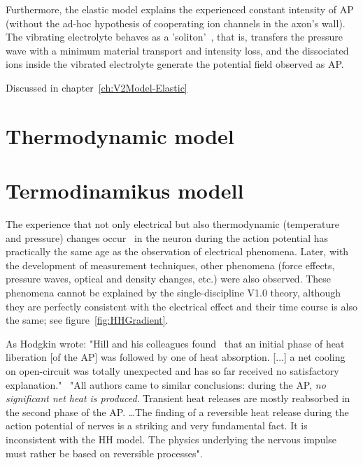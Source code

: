 Furthermore, the  elastic model explains the experienced constant intensity
of \gls{AP} (without the ad-hoc hypothesis of cooperating
ion channels in the axon's wall). The vibrating electrolyte 
behaves as a 'soliton'~\cite{SolitonPropagation:2005}, that is, transfers the pressure wave with a minimum material transport and intensity loss, and the dissociated ions inside the vibrated electrolyte generate the potential field observed as \gls{AP}.



Discussed in chapter~\ref{ch:V2Model-Elastic}

\fi




\ifx\magyar\undefined
\section[Thermodynamic model]{Thermodynamic model\label{sec:V2-0_ThermodynamicModel}}

\else
\section[Termodinamikus modell]{Termodinamikus modell\label{sec:V2-0_ThermodynamicModel}}

\fi

\ifx\magyar\undefined
The experience that not only electrical but also thermodynamic (temperature and pressure) changes occur~\cite{HeatProductionNeuron:1958} in the neuron during the action potential has practically the same age as the observation of electrical phenomena. Later, with the development of measurement techniques, other phenomena (force effects, pressure waves, optical and density changes, etc.) were also observed. These phenomena cannot be explained by the single-discipline V1.0 theory, although they are perfectly consistent with the electrical effect and their time course is also the same; see figure~\ref{fig:HHGradient}.



As Hodgkin wrote: "Hill and his colleagues found~\cite{HeatProductionNeuron:1958} that an initial phase of heat liberation [of the \gls{AP}] was followed by one of
heat absorption. [...] a net cooling on open-circuit was totally unexpected
and has so far received no satisfactory explanation."~\cite{HodgkinConduction:1964}
"All authors came to similar conclusions: during
the \gls{AP}, \textit{no signiﬁcant net heat is produced}. Transient heat releases are mostly reabsorbed in the second phase of the \gls{AP}. \dots The ﬁnding of a reversible heat release during the action potential of
nerves is a striking and very fundamental fact. It is inconsistent with the
\gls{HH} model.
The physics underlying the nervous impulse
must rather be based on reversible processes".~\cite{ThermalBiophysics:2007}

